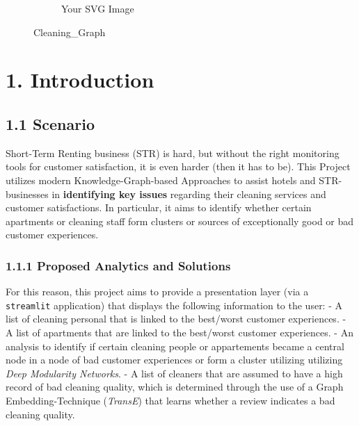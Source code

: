 \documentclass[
]{article}
\author{}
\date{}
\makeatletter
\newcommand*\pandocbounded[1]{%
  \sbox\pandoc@box{#1}%
  \Gscale@div\@tempa{\textheight}{\dimexpr\ht\pandoc@box+\dp\pandoc@box\relax}%
  \Gscale@div\@tempb{\linewidth}{\wd\pandoc@box}%
  \ifdim\@tempb\p@<\@tempa\p@\let\@tempa\@tempb\fi%
  \ifdim\@tempa\p@<\p@\scalebox{\@tempa}{\usebox\pandoc@box}%
  \else\usebox{\pandoc@box}%
  \fi%
}
\makeatother
\begin{document}
\begin{figure}
\centering

\begin{figure}[ht]
  \centering
  
  \caption{Your SVG Image}
  \label{fig:svgimage}
\end{figure}

\caption{Cleaning\_Graph}
\end{figure}

\section{1. Introduction}\label{introduction}

\subsection{1.1 Scenario}\label{scenario}

Short-Term Renting business (STR) is hard, but without the right
monitoring tools for customer satisfaction, it is even harder (then it
has to be). This Project utilizes modern Knowledge-Graph-based
Approaches to assist hotels and STR-businesses in \textbf{identifying
key issues} regarding their cleaning services and customer
satisfactions. In particular, it aims to identify whether certain
apartments or cleaning staff form clusters or sources of exceptionally
good or bad customer experiences.

\subsubsection{1.1.1 Proposed Analytics and
Solutions}\label{proposed-analytics-and-solutions}

For this reason, this project aims to provide a presentation layer (via
a \texttt{streamlit} application) that displays the following
information to the user: - A list of cleaning personal that is linked to
the best/worst customer experiences. - A list of apartments that are
linked to the best/worst customer experiences. - An analysis to identify
if certain cleaning people or appartements became a central node in a
node of bad customer experiences or form a cluster utilizing utilizing
\emph{Deep Modularity Networks}. - A list of cleaners that are assumed
to have a high record of bad cleaning quality, which is determined
through the use of a Graph Embedding-Technique (\emph{TransE}) that
learns whether a review indicates a bad cleaning quality.
\end{document}
